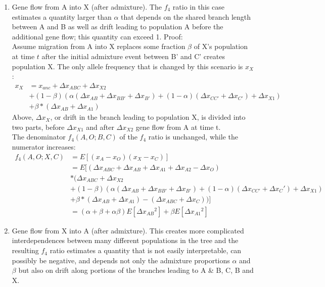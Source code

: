 \documentclass[12pt]{report}
\begin{document}
\begin{enumerate}
	\item Gene flow from A into X (after admixture). The $f_4$ ratio in this case estimates a quantity larger than $\alpha$ that depends on the shared branch length between A and B as well as drift leading to population A before the additional gene flow; this quantity can exceed 1. Proof:\\
	Assume migration from A into X replaces some fraction $\beta$ of X's population at time $t$ after the initial admixture event between B' and C' creates population X. The only allele frequency that is changed by this scenario is $x_X$:
	\begin{align*}
	x_X &= x_{anc} + \Delta{x_{ABC}} + \Delta{x_{X2}} \\
	&+ (1 - \beta)(\alpha(\Delta{x_{AB}} + \Delta{x_{BB'}} + \Delta{x_{B'}}) + (1 - \alpha)(\Delta{x_{CC'}} + \Delta{x_{C'}}) + \Delta{x_{X1}}) \\
	&+ \beta*(\Delta{x_{AB}} + \Delta{x_{A1}})
	\end{align*}
	Above, $\Delta{x_X}$, or drift in the branch leading to population X, is divided into two parts, before $\Delta{x_{X1}}$ and after $\Delta{x_{X2}}$ gene flow from A at time t.\\
	The denominator $f_4(A,O;B,C)$ of the $f_4$ ratio is unchanged, while the numerator increases:
	\begin{align*}
	f_4(A,O;X,C) &= E[(x_A - x_O)(x_X - x_C)] \\
	&= E[(\Delta{x_{ABC}} + \Delta{x_{AB}} + \Delta{x_{A1}} + \Delta{x_{A2}} - \Delta{x_{O}}) \\
	&*(\Delta{x_{ABC}} + \Delta{x_{X2}} \\
	&+ (1 - \beta)(\alpha(\Delta{x_{AB}} + \Delta{x_{BB'}} + \Delta{x_{B'}}) + (1 - \alpha)(\Delta{x_{CC'}} + \Delta{x_C'}) + \Delta{x_{X1}}) \\
	&+ \beta*(\Delta{x_{AB}} + \Delta{x_{A1}}) - (\Delta{x_{ABC}} + \Delta{x_C}))]\\
	&=(\alpha + \beta + \alpha\beta) E[\Delta{x_{AB}}^2] + \beta E[\Delta{x_{A1}}^2]
	\end{align*} %
	
	\item Gene flow from X into A (after admixture). This creates more complicated interdependences between many different populations in the tree and the resulting $f_4$ ratio estimates a quantity that is not easily interpretable, can possibly be negative, and depends not only the admixture proportions $\alpha$ and $\beta$ but also on drift along portions of the branches leading to A \& B, C, B and X.
	

\end{enumerate}
\end{document}
